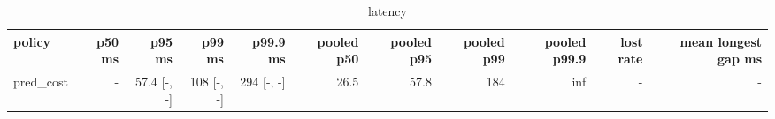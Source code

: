 \begin{table}[t]\centering\small
\begin{tabular}{lrrrrrrrrrr}\toprule
policy & p50 ms & p95 ms & p99 ms & p99.9 ms & pooled p50 & pooled p95 & pooled p99 & pooled p99.9 & lost rate & mean longest gap ms \\\midrule
pred\_cost & - & 57.4 [-, -] & 108 [-, -] & 294 [-, -] & 26.5 & 57.8 & 184 & inf & - & - \\
\bottomrule\end{tabular}\caption{latency}\end{table}
